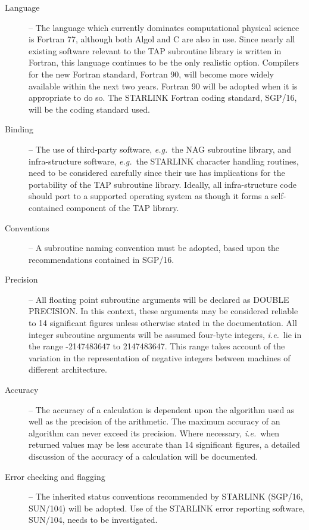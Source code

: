 \begin {description}
\item [Language] -- The language which currently dominates computational
physical science is Fortran 77, although both Algol and C are also in use.
Since nearly all existing software relevant to the TAP subroutine library
is written in Fortran, this language continues to be the only realistic option.
Compilers for the new Fortran standard, Fortran 90, will become more widely
available within the next two years.
Fortran 90 will be adopted when it is appropriate to do so.
The STARLINK Fortran coding standard, SGP/16, will be the coding standard used.

\item [Binding] -- The use of third-party software, {\em e.g.}\ the NAG
subroutine library, and infra-structure software, {\em e.g.}\ the STARLINK
character handling routines, need to be considered carefully since their
use has implications for the portability of the TAP subroutine library.
Ideally, all infra-structure code should port to a supported operating
system as though it forms a self-contained component of the TAP library.

\item [Conventions] -- A subroutine naming convention must be adopted, based
upon the recommendations  contained in SGP/16.

\item [Precision] -- All floating point subroutine arguments will be
declared as DOUBLE PRECISION.
In this context, these arguments may be considered reliable to 14 significant
figures unless otherwise stated in the documentation.
All integer subroutine arguments will be assumed four-byte integers, {\em
i.e.}\ lie in the range -2147483647 to 2147483647.
This range takes account of the variation in the representation of negative
integers between machines of different architecture.

\item [Accuracy] -- The accuracy of a calculation is dependent upon the
algorithm used as well as the precision of the arithmetic.
The maximum accuracy of an algorithm can never exceed its precision.
Where necessary, {\em i.e.}\ when returned values may be less accurate than
14 significant figures, a detailed discussion of the accuracy of a calculation
will be documented.

\item [Error checking and flagging] --
The inherited status conventions recommended by STARLINK (SGP/16, SUN/104)
will be adopted.
Use of the STARLINK error reporting software, SUN/104, needs to be investigated.
\end {description}


